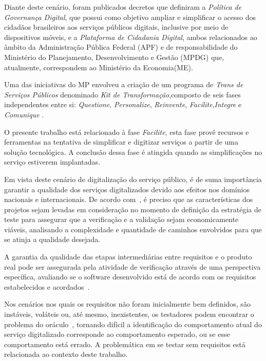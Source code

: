 Diante deste cenário, foram publicados decretos que definiram a \textit{Política de Governança Digital}, que possui como objetivo
ampliar e simplificar o acesso dos cidadãos brasileiros aos serviços públicos digitais, inclusive por meio
de dispositivos móveis, e a \textit{Plataforma de Cidadania Digital}, ambos relacionados ao âmbito da Administração Pública Federal
(APF) e de responsabilidade do Ministério do Planejamento, Desenvolvimento e Gestão (MPDG) \cite{BRASIL} que, atualmente,
correspondem ao Ministério da Economia(ME).

Uma das iniciativas do MP envolveu a criação de um programa de \textit{Trans de Serviços Públicos} denominado
\textit{Kit de Transformação},composto de seis fases independentes entre si: \textit{Questione}, \textit{Personalize},
\textit{Reinvente}, \textit{Facilite},\textit{Integre} e \textit{Comunique} \cite{BRASIL2017}.

O presente trabalho está relacionado à fase \textit{Facilite}, esta fase provê recursos e ferramentas na tentativa de simplificar
e digitizar serviços a partir de uma solução tecnológica. A conclusão dessa fase é atingida quando as simplificações no serviço
estiverem implantadas.

Em vista deste cenário de digitalização do serviço público, é de suma importância garantir a qualidade dos serviços digitalizados
devido aos efeitos nos domínios nacionais e internacionais. De acordo com~\cite{myers2004art}, é preciso que as características
dos projetos sejam levadas em consideração no momento de definição da estratégia de teste para assegurar que a verificação e
a validação sejam economicamente viáveis, analisando a complexidade e quantidade de caminhos envolvidos para que se atinja a
qualidade desejada.

A garantia da qualidade das etapas intermediárias entre requisitos e o produto real pode ser assegurada pela atividade de
verificação através de uma perspectiva específica, avaliando se o software desenvolvido está de acordo com os requisitos
estabelecidos e acordados~\cite{wallace1989software}.

Nos cenários nos quais os requisitos não foram inicialmente bem definidos, são instáveis, voláteis ou, até mesmo, inexistentes,
os testadores podem encontrar o problema do oráculo~\cite{barr2015oracle}, tornando difícil a identificação do comportamento atual
do serviço digitalizado corresponde ao comportamento esperado, ou se esse comportamento está errado. A problemática em se testar sem
requisitos está relacionada ao contexto deste trabalho.


